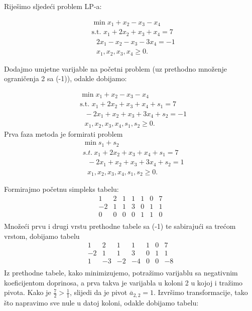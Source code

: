 \documentclass[a4paper, utf8, 11pt, colorlinks]{book}
\begin{document}
 
 
Riješimo sljedeći problem LP-a:

\begin{align*}
	 &\min x_1 + x_2 - x_3 - x_4 \\
	 &\mbox{s.t.   } x_1 + 2x_2 + x_3 + x_4 = 7 \\
	 &\mbox{\ \ \ \ \ \ \ } 2x_1 - x_2 - x_3 - 3x_4 = -1 \\
	 &\mbox{\ \ \ \ \ \ \ }  x_1,x_2,x_3,x_4 \geq 0.
\end{align*}

Dodajmo umjetne varijable na početni problem (uz prethodno množenje ograničenja 2 sa (-1)), odakle dobijamo:

\begin{align*}
	&\min x_1 + x_2 - x_3 - x_4 \\
	&\mbox{s.t.   } x_1 + 2x_2 + x_3 + x_4 + s_1 = 7 \\
	&\mbox{\ \ \ \ \ \ \ } -2x_1 + x_2 + x_3 + 3x_4 + s_2 = -1 \\
	&\mbox{\ \ \ \ \ \ \ }  x_1,x_2,x_3,x_4, s_1, s_2\geq 0.
\end{align*}
Prva faza metoda je formirati problem 
\begin{align*}
	&\min s_1 + s_2 \\
		& {s.t.\ } x_1 + 2x_2 + x_3 + x_4 + s_1 = 7 \\
	&\mbox{\ \ \ \ \ \ \ } -2x_1 + x_2 + x_3 + 3x_4 + s_2 = 1 \\
	&\mbox{\ \ \ \ \ \ \ }  x_1,x_2,x_3,x_4, s_1, s_2\geq 0.
\end{align*}


Formirajmo početnu simpleks tabelu:\\
$$\begin{array}{cccccc|c}
	1 & 2 & 1 & 1 & 1 &  0 & 7  \\
   -2 & 1 & 1 & 3 & 0 &  1 & 1  \\ \hline
    0 & 0 & 0 & 0 & 1 & 1 &  0  \\
\end{array}
$$
Množeći prvu i drugi vrstu prethodne tabele sa (-1) te sabirajući sa trećom vrstom, dobijamo tabelu
$$\begin{array}{cccccc|c}
	1 & 2 & 1 & 1 & 1 & 0 & 7 \\
	-2&1  & 1 & 3 & 0 & 1 & 1 \\ \hline
	1 & -3 & -2 & -4 & 0 & 0 & -8 \\ 
\end{array}
 $$
 Iz prethodne tabele, kako minimizujemo, potražimo varijablu 
 sa negativnim koeficijentom doprinosa, a prva takva je varijabla u koloni 2 u kojoj 
 i tražimo pivota.  Kako je $\frac{7}{2} > \frac{1}{1}$, slijedi da je 
 pivot $\overline{a}_{2,2} = 1$. Izvršimo transformacije, tako što napravimo sve nule u datoj koloni, odakle dobijamo tabelu:
 
\end{document}
